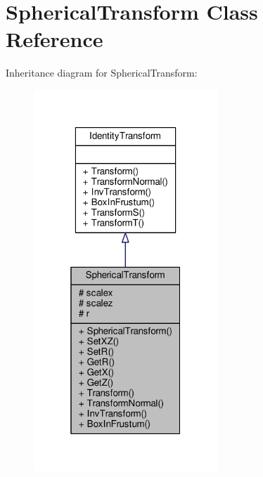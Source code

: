 \hypertarget{classSphericalTransform}{}\section{Spherical\+Transform Class Reference}
\label{classSphericalTransform}


Inheritance diagram for Spherical\+Transform\+:
\nopagebreak
\begin{figure}[H]
\begin{center}
\leavevmode
\includegraphics[width=196pt]{d6/d1e/classSphericalTransform__inherit__graph}
\end{center}
\end{figure}


